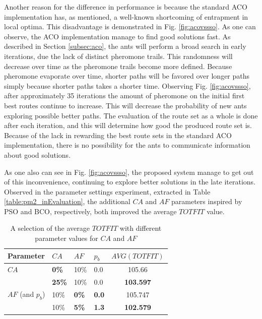 Another reason for the difference in performance is because the standard ACO implementation has, as mentioned, a well-known shortcoming of entrapment in local optima. This disadvantage is demonstrated in Fig. \ref{fig:acovssso}. As one can observe, the ACO implementation manage to find good solutions fast. As described in Section \vref{subsec:aco}, the ants will perform a broad search in early iterations, due the lack of distinct pheromone trails. This randomness will decrease over time as the pheromone trails become more defined. Because pheromone evaporate over time, shorter paths will be favored over longer paths simply because shorter paths takes a shorter time. Observing Fig. \ref{fig:acovssso}, after approximately 35 iterations the amount of pheromone on the initial first best routes continue to increase. This will decrease the probability of new ants exploring possible better paths. The evaluation of the route set as a whole is done after each iteration, and this will determine how good the produced route set is. Because of the lack in rewarding the best route sets in the standard ACO implementation, there is no possibility for the ants to communicate information about good solutions.

As one also can see in Fig. \ref{fig:acovssso}, the proposed system manage to get out of this inconvenience, continuing to explore better solutions in the late iterations. Observed in the parameter settings experiment, extracted in Table \vref{table:pm2_inEvaluation}, the additional $CA$ and $AF$ parameters inspired by PSO and BCO, respectively, both improved the average $TOTFIT$ value. 

\begin{table}
    \centering
    \begin{tabular}{|l|l|l|l|c|}
    \hline
    Parameter & $CA$ & $AF$ & $p_b$ & $AVG(TOTFIT)$ \\
    \hline
    $CA$ & \textbf{0\%} & 10\% & 0.0 & 105.66\\
    ~ & \textbf{25\%} & 10\% & 0.0 & \textbf{103.597}\\
    \hline
    $AF$ (and $p_b$) & 10\% & \textbf{0\%} & \textbf{0.0} & 105.747 \\
    ~ & 10\% & \textbf{5\%} & \textbf{1.3} & \textbf{102.579}\\
    \hline
    \end{tabular}
    \caption {A selection of the average $TOTFIT$ with different parameter values for $CA$ and $AF$}
    \label{table:pm2_inEvaluation}
\end{table}


